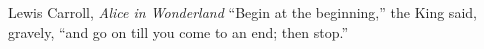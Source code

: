 \begin{chapquote}{Lewis Carroll, \textit{Alice in Wonderland}}
``Begin at the beginning,'' the King said, gravely, ``and go on till you
come to an end; then stop.''
\end{chapquote}
